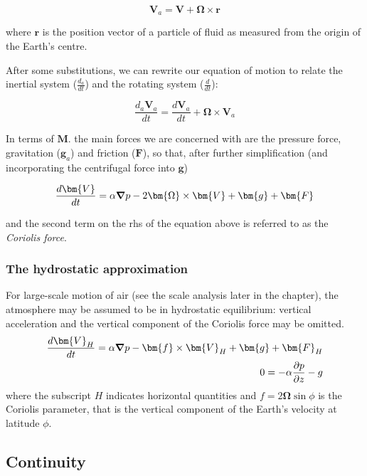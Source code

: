 \begin{equation}
	\bm{V}_a=\bm{V} + \bm{\Omega} \times \bm{r}
\end{equation}

where $\bm{r}$ is the position vector of a particle of fluid as measured from the origin of the Earth's centre.

After some substitutions, we can rewrite our equation of motion to relate the inertial system ($\frac{d_a}{dt}$) and the rotating system ($\frac{d}{dt}$):

\begin{equation}
	\frac{d_a \bm{V}_a}{dt}=   \frac{d \bm{V}_a}{dt}    + \bm{\Omega} \times \bm{V}_a
\end{equation}

In terms of $\bm{M}$. the main forces we are concerned with are the pressure force, gravitation  ($\bm{g}_a$) and friction ($\bm{F}$), so that, after further simplification (and incorporating the centrifugal force into $\bm{g}$)

\begin{equation}
	\frac{d \bm{V}}{dt} = \alpha \grad{p} -2 \bm{\Omega} \times \bm{V} + \bm{g} + \bm{F}
\end{equation}

and the second term on the rhs of the equation above is referred to as the \emph{Coriolis force}.

\subsubsection{The hydrostatic approximation}

For large-scale motion of air (see the scale analysis later in the chapter), the atmosphere may be assumed to be in hydrostatic equilibrium: vertical acceleration and the vertical component of the Coriolis force may be omitted.
\begin{eqnarray}
	\frac{d \bm{V}_H}{dt} = \alpha \grad{p} - \bm{f} \times \bm{V}_H + \bm{g} + \bm{F}_H\\
	0 = -\alpha \frac{\partial p}{\partial z} - g
\end{eqnarray}
where the subscript $H$ indicates horizontal quantities and $f=2\bm{\Omega}\sin{\phi}$ is the Coriolis parameter, that is the vertical component of the Earth's velocity at latitude $\phi$.

\subsection{Continuity}

